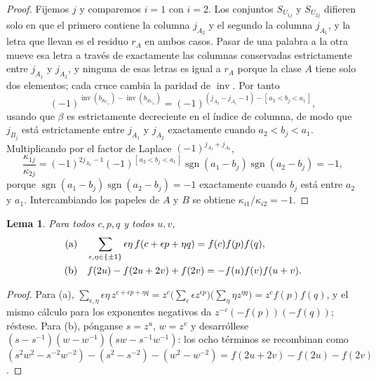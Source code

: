 \documentclass[11pt,reqno]{amsart}
\theoremstyle{plain}
\newtheorem{lemma}[theorem]{Lema}
\theoremstyle{definition}
\newcommand{\inv}{\operatorname{inv}}
\newcommand{\sgn}{\operatorname{sgn}}
\begin{document}
\begin{proof}
Fijemos $j$ y comparemos $i=1$ con $i=2$. Los conjuntos $S_{U_{1j}}$ y $S_{U_{2j}}$ difieren solo en
que el primero contiene la columna $j_{A_2}$ y el segundo la columna $j_{A_1}$, y la letra que llevan
es el residuo $r_A$ en ambos casos. Pasar de una palabra a la otra mueve esa letra a través de
exactamente las columnas conservadas estrictamente entre $j_{A_1}$ y $j_{A_2}$, y ninguna de esas
letras es igual a $r_A$ porque la clase $A$ tiene solo dos elementos; cada cruce cambia la paridad de
$\inv$. Por tanto
\[
(-1)^{\inv(b_{S_{U_{1j}}})-\inv(b_{S_{U_{2j}}})}
=(-1)^{(j_{A_2}-j_{A_1}-1)-[\,a_2<b_j<a_1\,]},
\]
usando que $\beta$ es estrictamente decreciente en el índice de columna, de modo que $j_{B_j}$ está
estrictamente entre $j_{A_1}$ y $j_{A_2}$ exactamente cuando $a_2<b_j<a_1$. Multiplicando por el
factor de Laplace $(-1)^{j_{A_1}+j_{A_2}}$,
\[
\frac{\kappa_{1j}}{\kappa_{2j}}
=(-1)^{2j_{A_2}-1}(-1)^{[\,a_2<b_j<a_1\,]}\sgn(a_1-b_j)\sgn(a_2-b_j)=-1,
\]
porque $\sgn(a_1-b_j)\sgn(a_2-b_j)=-1$ exactamente cuando $b_j$ está entre $a_2$ y $a_1$.
Intercambiando los papeles de $A$ y $B$ se obtiene $\kappa_{i1}/\kappa_{i2}=-1$.
\end{proof}

\begin{lemma}\label{lem:L5}
Para todos $c,p,q$ y todos $u,v$,
\begin{align*}
\text{\rm(a)}&\quad \sum_{\epsilon,\eta\in\{\pm1\}}\epsilon\eta\,f(c+\epsilon p+\eta q)=f(c)f(p)f(q),\\
\text{\rm(b)}&\quad f(2u)-f(2u+2v)+f(2v)=-f(u)f(v)f(u+v).
\end{align*}
\end{lemma}

\begin{proof}
Para (a), $\sum_{\epsilon,\eta}\epsilon\eta\,z^{c+\epsilon p+\eta q}
=z^{c}\bigl(\sum_\epsilon\epsilon z^{\epsilon p}\bigr)\bigl(\sum_\eta\eta z^{\eta q}\bigr)
=z^{c}f(p)f(q)$, y el mismo cálculo para los exponentes negativos da $z^{-c}(-f(p))(-f(q))$;
réstese. Para (b), pónganse $s=z^u$, $w=z^v$ y desarróllese
$(s-s^{-1})(w-w^{-1})(sw-s^{-1}w^{-1})$: los ocho términos se recombinan como
$(s^2w^2-s^{-2}w^{-2})-(s^2-s^{-2})-(w^2-w^{-2})=f(2u+2v)-f(2u)-f(2v)$.
\end{proof}
\end{document}
